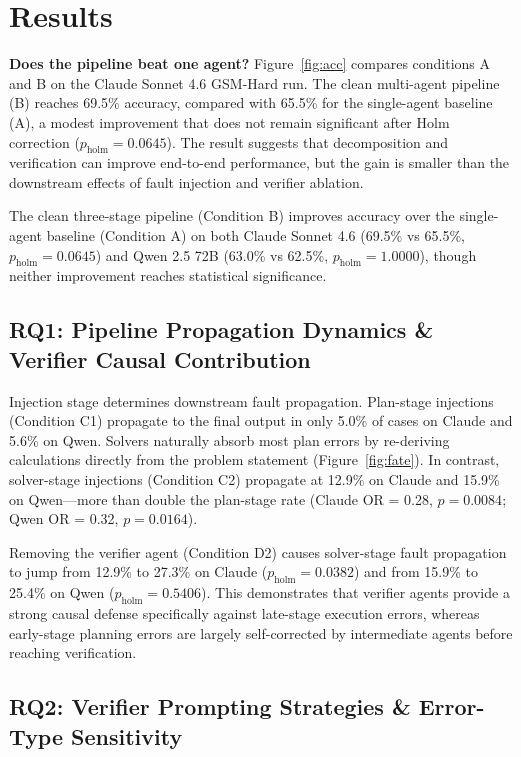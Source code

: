 \documentclass{article}
\begin{document}
\section{Results}

\textbf{Does the pipeline beat one agent?} Figure~\ref{fig:acc} compares
conditions A and B on the Claude Sonnet 4.6 GSM-Hard run. The clean
multi-agent pipeline (B) reaches 69.5\% accuracy, compared with 65.5\% for
the single-agent baseline (A), a modest improvement that does not remain
significant after Holm correction ($p_{\mathrm{holm}} = 0.0645$). The result
suggests that decomposition and verification can improve end-to-end
performance, but the gain is smaller than the downstream effects of fault
injection and verifier ablation.

The clean three-stage pipeline (Condition B) improves accuracy over the single-agent baseline (Condition A) on both Claude Sonnet 4.6 (69.5\% vs 65.5\%, $p_{\mathrm{holm}} = 0.0645$) and Qwen 2.5 72B (63.0\% vs 62.5\%, $p_{\mathrm{holm}} = 1.0000$), though neither improvement reaches statistical significance.

\subsection*{RQ1: Pipeline Propagation Dynamics \& Verifier Causal Contribution}

Injection stage determines downstream fault propagation. Plan-stage injections (Condition C1) propagate to the final output in only 5.0\% of cases on Claude and 5.6\% on Qwen. Solvers naturally absorb most plan errors by re-deriving calculations directly from the problem statement (Figure~\ref{fig:fate}). In contrast, solver-stage injections (Condition C2) propagate at 12.9\% on Claude and 15.9\% on Qwen—more than double the plan-stage rate (Claude OR = 0.28, $p = 0.0084$; Qwen OR = 0.32, $p = 0.0164$). 

Removing the verifier agent (Condition D2) causes solver-stage fault propagation to jump from 12.9\% to 27.3\% on Claude ($p_{\mathrm{holm}} = 0.0382$) and from 15.9\% to 25.4\% on Qwen ($p_{\mathrm{holm}} = 0.5406$). This demonstrates that verifier agents provide a strong causal defense specifically against late-stage execution errors, whereas early-stage planning errors are largely self-corrected by intermediate agents before reaching verification.

\subsection*{RQ2: Verifier Prompting Strategies \& Error-Type Sensitivity}
\end{document}
